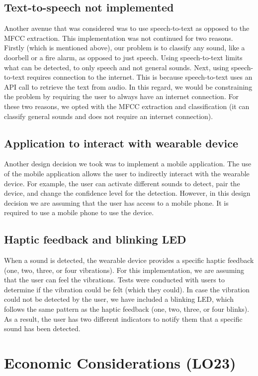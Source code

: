 \documentclass{article}
\begin{document}
\subsection{Text-to-speech not implemented}
Another avenue that was considered was to use speech-to-text as opposed to the MFCC extraction. This implementation was not continued for two reasons. Firstly (which is mentioned above), our problem is to classify any sound, like a doorbell or a fire alarm, as opposed to just speech. Using speech-to-text limits what can be detected, to only speech and not general sounds. Next, using speech-to-text requires connection to the internet. This is because speech-to-text uses an API call to retrieve the text from audio. In this regard, we would be constraining the problem by requiring the user to always have an internet connection. For these two reasons, we opted with the MFCC extraction and classification (it can classify general sounds and does not require an internet connection).
\subsection{Application to interact with wearable device}
Another design decision we took was to implement a mobile application. The use of the mobile application allows the user to indirectly interact with the wearable device. For example, the user can activate different sounds to detect, pair the device, and change the confidence level for the detection. However, in this design decision we are assuming that the user has access to a mobile phone. It is required to use a mobile phone to use the device. 
\subsection{Haptic feedback and blinking LED}
When a sound is detected, the wearable device provides a specific haptic feedback (one, two, three, or four vibrations). For this implementation, we are assuming that the user can feel the vibrations. Tests were conducted with users to determine if the vibration could be felt (which they could). In case the vibration could not be detected by the user, we have included a blinking LED, which follows the same pattern as the haptic feedback (one, two, three, or four blinks). As a result, the user has two different indicators to notify them that a specific sound has been detected. 

\section{Economic Considerations (LO23)}
\end{document}
